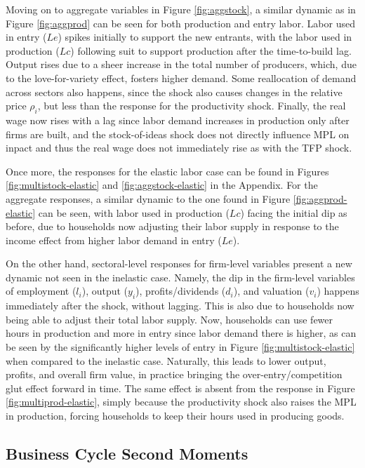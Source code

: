 \documentclass[a4paper,12pt]{article} %
\numberwithin{equation}{section} %
\numberwithin{figure}{section}
\numberwithin{table}{section}
\begin{document}
Moving on to aggregate variables in Figure \ref{fig:aggstock}, a similar dynamic as in Figure \ref{fig:aggprod} can be seen for both 
production and entry labor. Labor used in entry ($Le$) spikes initially to support the new entrants, with the labor used in production ($Lc$)
following suit to support production after the time-to-build lag. Output rises due to a sheer increase in the total number of producers, which,
due to the love-for-variety effect, fosters higher demand. Some reallocation of demand across sectors also happens, since the shock also causes
changes in the relative price $\rho_i$, but less than the response for the productivity shock. Finally, the real wage now rises with a lag since
labor demand increases in production only after firms are built, and the stock-of-ideas shock does not directly influence MPL on inpact and thus the 
real wage does not immediately rise as with the TFP shock.

Once more, the responses for the elastic labor case can be found in Figures \ref{fig:multistock-elastic} and \ref{fig:aggstock-elastic} 
in the Appendix.
For the aggregate responses, a similar dynamic to the one found in Figure \ref{fig:aggprod-elastic} can be seen, with labor used in 
production ($Lc$) facing the initial dip as before, due to households now adjusting their labor supply in response to the income effect 
from higher labor demand in entry ($Le$).

On the other hand, sectoral-level responses for firm-level variables present a new dynamic not seen in the inelastic case. Namely, the dip in the
firm-level variables of employment ($l_i$), output ($y_i$), profits/dividends ($d_i$), and valuation ($v_i$) happens immediately after the shock,
without lagging. This is also due to households now being able to adjust their total labor supply. Now, households can use fewer hours in production
and more in entry since labor demand there is higher, as can be seen by the significantly higher levels of entry in Figure \ref{fig:multistock-elastic}
when compared to the inelastic case. Naturally, this leads to lower output, profits, and overall firm value, in practice bringing the 
over-entry/competition glut effect forward in time. The same effect is absent from the response in Figure \ref{fig:multiprod-elastic}, simply because
the productivity shock also raises the MPL in production, forcing households to keep their hours used in producing goods. 


\subsection{Business Cycle Second Moments}
\label{sec:quant-BCmon}
\end{document}
